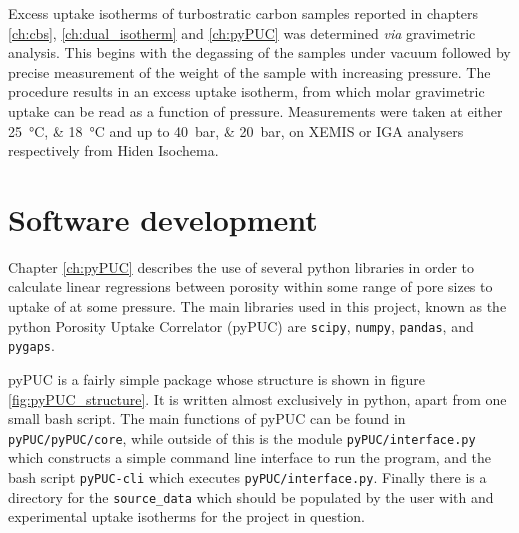 Excess  uptake isotherms of \gls{turbostratic carbon} samples reported in chapters \ref{ch:cbs}, \ref{ch:dual_isotherm} and \ref{ch:pyPUC} was determined \textit{via} gravimetric analysis. This begins with the degassing of the samples under vacuum followed by precise measurement of the weight of the sample with increasing  pressure. The procedure results in an excess  uptake isotherm, from which molar gravimetric uptake can be read as a function of pressure. Measurements were taken at either \qtylist[list-pair-separator={ or }, list-units=single]{25;18}{\degreeCelsius} and up to \qtylist[list-pair-separator={ or }, list-units=single]{40;20}{\bar}, on XEMIS or IGA analysers respectively from Hiden Isochema. 

\section{Software development}
Chapter \ref{ch:pyPUC} describes the use of several python libraries in order to calculate linear regressions between porosity within some range of pore sizes to uptake of  at some pressure. The main libraries used in this project, known as the python Porosity Uptake Correlator (pyPUC) are \verb|scipy|,\citep{SciPy2020} \verb|numpy|,\citep{numpy2022} \verb|pandas|,\citep{pandas2010} and \verb|pygaps|.\citep{Iacomi2019pyGAPS}

pyPUC is a fairly simple package whose structure is shown in figure \ref{fig:pyPUC_structure}. It is written almost exclusively in python,\citep{python1995} apart from one small bash script.\citep{bash2007} The main functions of pyPUC can be found in \verb|pyPUC/pyPUC/core|, while outside of this is the module \verb|pyPUC/interface.py| which constructs a simple command line interface to run the program, and the bash script \verb|pyPUC-cli| which executes \verb|pyPUC/interface.py|. Finally there is a directory for the \verb|source_data| which should be populated by the user with  and experimental uptake isotherms for the project in question.

